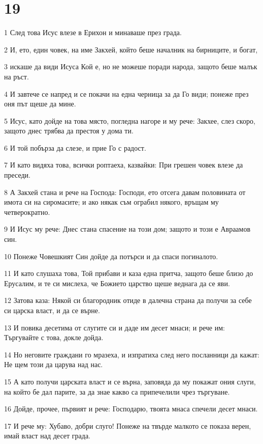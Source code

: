 \chapter{19}

\par 1 След това Исус влезе в Ерихон и минаваше през града.
\par 2 И, ето, един човек, на име Закхей, който беше началник на бирниците, и богат,
\par 3 искаше да види Исуса Кой е, но не можеше поради народа, защото беше малък на ръст.
\par 4 И завтече се напред и се покачи на една черница за да Го види; понеже през оня път щеше да мине.
\par 5 Исус, като дойде на това място, погледна нагоре и му рече: Закхее, слез скоро, защото днес трябва да престоя у дома ти.
\par 6 И той побърза да слезе, и прие Го с радост.
\par 7 И като видяха това, всички роптаеха, казвайки: При грешен човек влезе да преседи.
\par 8 А Закхей стана и рече на Господа: Господи, ето отсега давам половината от имота си на сиромасите; и ако някак съм ограбил някого, връщам му четверократно.
\par 9 И Исус му рече: Днес стана спасение на този дом; защото и този е Авраамов син.
\par 10 Понеже Човешкият Син дойде да потърси и да спаси погиналото.
\par 11 И като слушаха това, Той прибави и каза една притча, защото беше близо до Ерусалим, и те си мислеха, че Божието царство щеше веднага да се яви.
\par 12 Затова каза: Някой си благородник отиде в далечна страна да получи за себе си царска власт, и да се върне.
\par 13 И повика десетима от слугите си и даде им десет мнаси; и рече им: Търгувайте с това, докле дойда.
\par 14 Но неговите граждани го мразеха, и изпратиха след него посланници да кажат: Не щем този да царува над нас.
\par 15 А като получи царската власт и се върна, заповяда да му покажат ония слуги, на който бе дал парите, за да знае какво са припечелили чрез търгуване.
\par 16 Дойде, прочее, първият и рече: Господарю, твоята мнаса спечели десет мнаси.
\par 17 И рече му: Хубаво, добри слуго! Понеже на твърде малкото се показа верен, имай власт над десет града.
